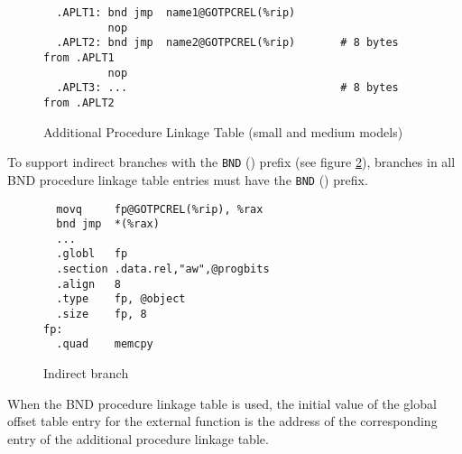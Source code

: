 \begin{figure}[H]
\Hrule
\caption{Additional Procedure Linkage Table (small and medium models)}
\label{ext_small_med_plt}
\begin{footnotesize}
\begin{verbatim}
  .APLT1: bnd jmp  name1@GOTPCREL(%rip)
          nop
  .APLT2: bnd jmp  name2@GOTPCREL(%rip)       # 8 bytes from .APLT1
          nop
  .APLT3: ...                                 # 8 bytes from .APLT2
\end{verbatim}%
\end{footnotesize}
\Hrule
\end{figure}

To support indirect branches with the \texttt{BND} () prefix
(see figure \ref{indirect_branch}), branches in all BND procedure linkage
table entries must have the \texttt{BND} () prefix.

\begin{figure}[H]
\Hrule
\caption{Indirect branch}
\label{indirect_branch}
\begin{footnotesize}
\begin{verbatim}
  movq     fp@GOTPCREL(%rip), %rax
  bnd jmp  *(%rax)
  ...
  .globl   fp
  .section .data.rel,"aw",@progbits
  .align   8
  .type    fp, @object
  .size    fp, 8
fp:
  .quad    memcpy
\end{verbatim}%
\end{footnotesize}
\Hrule
\end{figure}

When the BND procedure linkage table is used, the initial value of the
global offset table entry for the external function is the address of the
corresponding entry of the additional procedure linkage table.


